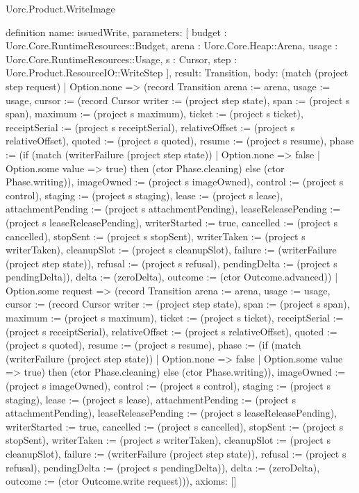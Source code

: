 \begin{lexlean}{Uorc.Product.WriteImage}
\begin{semanticmodule}
definition{
  name: issuedWrite,
  parameters: [
    budget : Uorc.Core.RuntimeResources::Budget,
    arena : Uorc.Core.Heap::Arena,
    usage : Uorc.Core.RuntimeResources::Usage,
    s : Cursor,
    step : Uorc.Product.ResourceIO::WriteStep
  ],
  result: Transition,
  body: (match (project step request)
    | Option.none => (record Transition {arena := arena, usage := usage, cursor := (record Cursor {writer := (project step state), span := (project s span), maximum := (project s maximum), ticket := (project s ticket), receiptSerial := (project s receiptSerial), relativeOffset := (project s relativeOffset), quoted := (project s quoted), resume := (project s resume), phase := (if (match (writerFailure (project step state))
      | Option.none => false
      | Option.some value => true) then (ctor Phase.cleaning) else (ctor Phase.writing)), imageOwned := (project s imageOwned), control := (project s control), staging := (project s staging), lease := (project s lease), attachmentPending := (project s attachmentPending), leaseReleasePending := (project s leaseReleasePending), writerStarted := true, cancelled := (project s cancelled), stopSent := (project s stopSent), writerTaken := (project s writerTaken), cleanupSlot := (project s cleanupSlot), failure := (writerFailure (project step state)), refusal := (project s refusal), pendingDelta := (project s pendingDelta)}), delta := (zeroDelta), outcome := (ctor Outcome.advanced)})
    | Option.some request => (record Transition {arena := arena, usage := usage, cursor := (record Cursor {writer := (project step state), span := (project s span), maximum := (project s maximum), ticket := (project s ticket), receiptSerial := (project s receiptSerial), relativeOffset := (project s relativeOffset), quoted := (project s quoted), resume := (project s resume), phase := (if (match (writerFailure (project step state))
      | Option.none => false
      | Option.some value => true) then (ctor Phase.cleaning) else (ctor Phase.writing)), imageOwned := (project s imageOwned), control := (project s control), staging := (project s staging), lease := (project s lease), attachmentPending := (project s attachmentPending), leaseReleasePending := (project s leaseReleasePending), writerStarted := true, cancelled := (project s cancelled), stopSent := (project s stopSent), writerTaken := (project s writerTaken), cleanupSlot := (project s cleanupSlot), failure := (writerFailure (project step state)), refusal := (project s refusal), pendingDelta := (project s pendingDelta)}), delta := (zeroDelta), outcome := (ctor Outcome.write request)})),
  axioms: []
}


\end{semanticmodule}
\end{lexlean}
